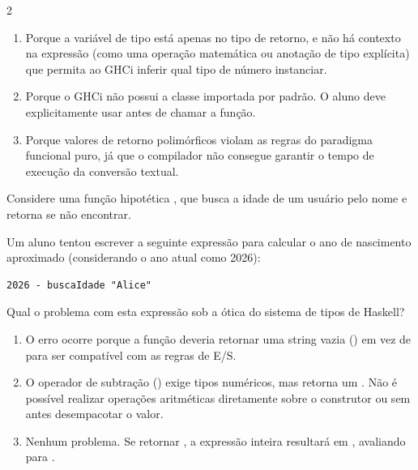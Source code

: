 \documentclass[a4paper,10pt,brazil]{article}
\begin{document}
\begin{multicols}{2}
\begin{enumerate}
  \item Porque a variável de tipo  está apenas no tipo de retorno, e não há contexto na expressão (como uma operação matemática ou anotação de tipo explícita) que permita ao GHCi inferir qual tipo de número instanciar.

  \item Porque o GHCi não possui a classe  importada por padrão. O aluno deve explicitamente usar  antes de chamar a função.

  \item Porque valores de retorno polimórficos violam as regras do paradigma funcional puro, já que o compilador não consegue garantir o tempo de execução da conversão textual.


\end{enumerate}

Considere uma função hipotética , que busca a idade de um usuário pelo nome e retorna  se não encontrar. 

Um aluno tentou escrever a seguinte expressão para calcular o ano de nascimento aproximado (considerando o ano atual como 2026):
\begin{verbatim}
2026 - buscaIdade "Alice"
\end{verbatim}

Qual o problema com esta expressão sob a ótica do sistema de tipos de Haskell?

\begin{enumerate}
  \item O erro ocorre porque a função  deveria retornar uma string vazia () em vez de  para ser compatível com as regras de E/S.

  \item O operador de subtração (\haskellinline{-}) exige tipos numéricos, mas  retorna um . Não é possível realizar operações aritméticas diretamente sobre o construtor  ou  sem antes desempacotar o valor.

  \item Nenhum problema. Se  retornar , a expressão inteira resultará em , avaliando para .


\end{enumerate}
\end{multicols}
\end{document}
